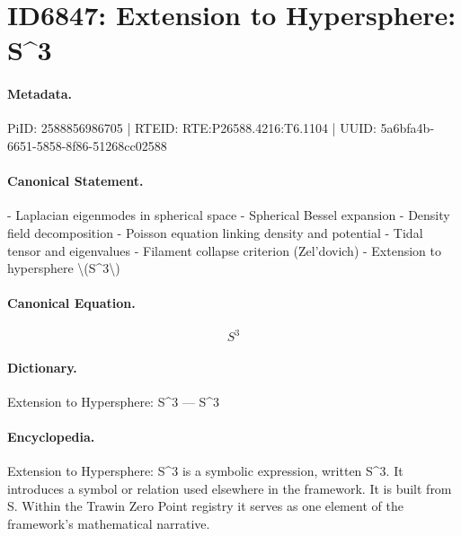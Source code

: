 \section*{ID6847: Extension to Hypersphere: S\textasciicircum{}3}
\paragraph{Metadata.}
PiID: 2588856986705 | RTEID: RTE:P26588.4216:T6.1104 | UUID: 5a6bfa4b-6651-5858-8f86-51268cc02588

\paragraph{Canonical Statement.}
- Laplacian eigenmodes in spherical space - Spherical Bessel expansion - Density field decomposition - Poisson equation linking density and potential - Tidal tensor and eigenvalues - Filament collapse criterion (Zel’dovich) - Extension to hypersphere \textbackslash{}(S\textasciicircum{}3\textbackslash{})

\paragraph{Canonical Equation.}
\[
S^3
\]

\paragraph{Dictionary.}
Extension to Hypersphere: S\textasciicircum{}3 — S\textasciicircum{}3

\paragraph{Encyclopedia.}
Extension to Hypersphere: S\textasciicircum{}3 is a symbolic expression, written S\textasciicircum{}3. It introduces a symbol or relation used elsewhere in the framework. It is built from S. Within the Trawin Zero Point registry it serves as one element of the framework's mathematical narrative.
